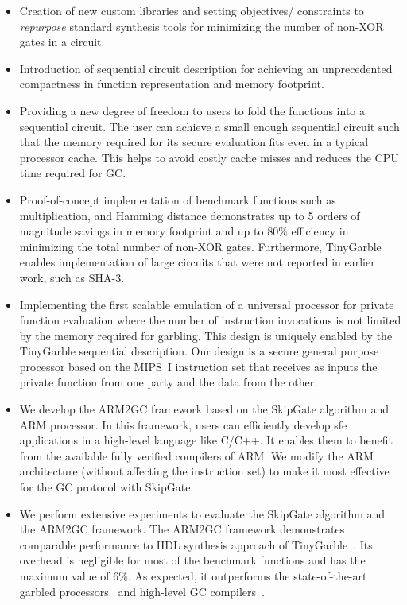 \begin{itemize}
\item
  Creation of new custom libraries and setting objectives/ constraints to \emph{repurpose} standard synthesis tools for minimizing the number of non-XOR gates in a circuit.
\item
  Introduction of sequential circuit description for achieving an unprecedented compactness in function representation and memory footprint.
\item
  Providing a new degree of freedom to users to fold the functions into a sequential circuit.
  The user can achieve a small enough sequential circuit such that the memory required for its secure evaluation fits even in a typical processor cache.
  This helps to avoid costly cache misses and reduces the CPU time required for GC.
\item
  Proof-of-concept implementation of benchmark functions such as multiplication, and Hamming distance demonstrates up to 5 orders of magnitude savings in memory footprint and up to $80\%$ efficiency in minimizing the total number of non-XOR gates.
  Furthermore, TinyGarble enables implementation of large circuits that were not reported in earlier work, such as SHA-3.%

\item
  Implementing the first scalable emulation of a universal processor for private function evaluation where the number of instruction invocations is not limited by the memory required for garbling.
  This design is uniquely enabled by the TinyGarble sequential description.
  Our design is a secure general purpose processor based on the MIPS~I instruction set that receives as inputs the private function from one party and the data from the other.
\item We develop the ARM2GC framework based on the SkipGate algorithm and ARM processor.
    In this framework, users can efficiently develop \acrshort{sfe} applications in a high-level language like C/C++.
    It enables them to benefit from the available fully verified compilers of ARM.
    We modify the ARM architecture (without affecting the instruction set) to make it most effective for the GC protocol with SkipGate.
\item We perform extensive experiments to evaluate the SkipGate algorithm and the ARM2GC framework.
    The ARM2GC framework demonstrates comparable performance to HDL synthesis approach of TinyGarble~\cite{songhori2015tinygarble}.
    Its overhead is negligible for most of the benchmark functions and has the maximum value of 6\%.
    As expected, it outperforms the state-of-the-art garbled processors~\cite{wang2016secure, songhori2016garbledcpu} and high-level GC compilers~\cite{holzer2012secure, mood2016frigate}.
\end{itemize}

